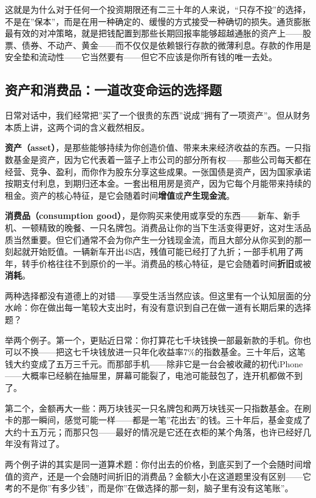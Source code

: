 \documentclass[a4paper,11pt,oneside,fontset=none,UTF8,zihao=-4]{ctexbook}
\begin{document}
这就是为什么对于任何一个投资期限还有二三十年的人来说，``只存不投''的选择，不是在''保本''，而是在用一种确定的、缓慢的方式接受一种确切的损失。通货膨胀最有效的对冲策略，就是把钱配置到那些长期回报率能够超越通胀的资产上------股票、债券、不动产、黄金------而不仅仅是依赖银行存款的微薄利息。存款的作用是安全垫和流动性------它当然要有------但它不应该是你所有钱的唯一去处。

\subsection{资产和消费品：一道改变命运的选择题}\label{ux8d44ux4ea7ux548cux6d88ux8d39ux54c1ux4e00ux9053ux6539ux53d8ux547dux8fd0ux7684ux9009ux62e9ux9898}

日常对话中，我们经常把''买了一个很贵的东西''说成''拥有了一项资产''。但从财务本质上讲，这两个词的含义截然相反。

\textbf{资产（asset）}，是那些能够持续为你创造价值、带来未来经济收益的东西。一只指数基金是资产，因为它代表着一篮子上市公司的部分所有权------那些公司每天都在经营、竞争、盈利，而你作为股东分享这些成果。一张国债是资产，因为国家承诺按期支付利息，到期归还本金。一套出租用房是资产，因为它每个月能带来持续的租金。资产的核心特征，是它会随着时间\textbf{增值}或\textbf{产生现金流}。

\textbf{消费品（consumption
good）}，是你购买来使用或享受的东西------新车、新手机、一顿精致的晚餐、一只名牌包。消费品让你的当下生活变得更好，这对生活品质当然重要。但它们通常不会为你产生一分钱现金流，而且大部分从你买到的那一刻起就开始贬值。一辆新车开出4S店，残值可能已经打了九折；一部手机用了两年，转手价格往往不到原价的一半。消费品的核心特征，是它会随着时间\textbf{折旧}或被\textbf{消耗}。

两种选择都没有道德上的对错------享受生活当然应该。但这里有一个认知层面的分水岭：你在做出每一笔较大支出时，有没有意识到自己在做一道有长期后果的选择题？

举两个例子。第一个，更贴近日常：你打算花七千块钱换一部最新款的手机。你也可以不换------把这七千块钱放进一只年化收益率7\%的指数基金。三十年后，这笔钱大约变成了五万三千元。而那部手机------除非它是一台会被收藏的初代iPhone------大概率已经躺在抽屉里，屏幕可能裂了，电池可能鼓包了，连开机都做不到了。

第二个，金额再大一些：两万块钱买一只名牌包和两万块钱买一只指数基金。在刷卡的那一瞬间，感觉可能一样------都是一笔''花出去''的钱。三十年后，基金变成了大约十五万元；而那只包------最好的情况是它还在衣柜的某个角落，也许已经好几年没有背过了。

两个例子讲的其实是同一道算术题：你付出去的价格，到底买到了一个会随时间增值的资产，还是一个会随时间折旧的消费品？金额大小在这道题里没有区别------它考的不是你''有多少钱''，而是你''在做选择的那一刻，脑子里有没有这笔账''。
\end{document}
